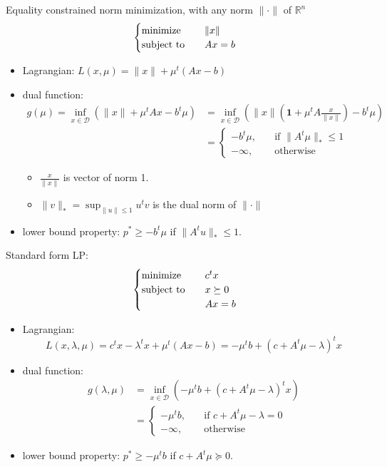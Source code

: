 \begin{remark}
    Equality constrained norm minimization, with any norm $\|\cdot\|$ of $\mathbb{R}^n$\[\begin{cases}
        \operatorname{minimize} \quad &\|x\|\\
        \operatorname{subject\ to} \quad &Ax = b
    \end{cases}\]
    \begin{itemize}
        \item Lagrangian: $L(x, \mu) = \|x\| + \mu^t(Ax - b)$
        \item dual function: 
            \begin{align*}
                g(\mu) = \inf_{x \in \mathcal{D}}\left(\|x\| + \mu^tAx - b^t\mu\right) &= \inf_{x \in \mathcal{D}}\left(\|x\|(\boldsymbol{1} + \mu^tA\frac{x}{\|x\|}) - b^t\mu\right)\\ 
                &=\begin{cases}
                    -b^t\mu, \quad&\text{if }\|A^t\mu\|_* \le 1\\
                    -\infty, \quad&\text{otherwise}
                \end{cases}
            \end{align*}
        \begin{itemize}
            \item $\frac{x}{\|x\|}$ is vector of norm 1.
            \item $\|v\|_* = \sup_{\|u\| \le 1}u^tv$ is the dual norm of $\|\cdot\|$
        \end{itemize}
        \item lower bound property: $p^* \ge -b^t\mu$ if $\|A^tu\|_* \le 1$.
    \end{itemize}
\end{remark}

\begin{remark}
    Standard form LP: \[\begin{cases}
        \operatorname{minimize} \quad & c^tx\\
        \operatorname{subject\ to} \quad & x \succeq 0\\
        & Ax = b
    \end{cases}\]
    \begin{itemize}
        \item Lagrangian: \[L(x, \lambda, \mu) = c^tx - \lambda^t x + \mu^t(Ax - b) = -\mu^tb + (c + A^t\mu - \lambda)^tx\]
        \item dual function: \begin{align*}
            g(\lambda, \mu) &= \inf_{x \in \mathcal{D}} \left(-\mu^tb + (c + A^t\mu - \lambda)^tx\right)\\
            &= \begin{cases}
                -\mu^tb, \quad &\text{if } c + A^t\mu - \lambda = 0\\
                -\infty, \quad &\text{otherwise}
            \end{cases}
        \end{align*}
        \item lower bound property: $p^* \ge -\mu^tb$ if $c + A^t\mu \succeq 0$.
    \end{itemize}
\end{remark}


